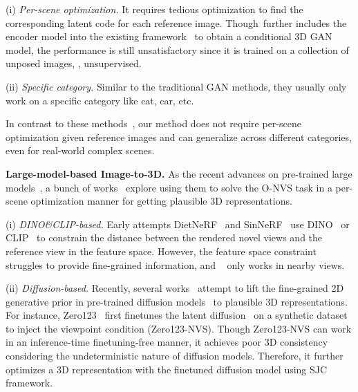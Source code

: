 (i) \textit{Per-scene optimization.} It requires tedious optimization to find the corresponding latent code for each reference image. Though~\cite{Pix2NeRF_cai2022pix2nerf}further includes the encoder model into the existing framework~\cite{PiGAN_chan2021pi} to obtain a conditional 3D GAN model, the performance is still unsatisfactory since it is trained on a collection of unposed images, \ie, unsupervised. 


(ii) \textit{Specific category.} Similar to the traditional GAN methods, they usually only work on a specific category like cat, car, etc.

In contrast to these methods~\cite{GRAF_schwarz2020graf,PiGAN_chan2021pi,GIRAFFE_niemeyer2021giraffe,chan2022EG3D}, our method does not require per-scene optimization given reference images and can generalize across different categories, even for real-world complex scenes. 


\vspace{0.1cm}
\noindent\textbf{Large-model-based Image-to-3D.} 
As the recent advances on pre-trained large models~\cite{caron2021emerging,radford2021CLIP,rombach2022LatentDiff,zhang2023addingControlNet}, a bunch of works~\cite{Jain_2021_ICCV_dietnerf,Xu_2022_SinNeRF,liu2023zero123,tang2023makeit3d} explore using them to solve the O-NVS task in a per-scene optimization manner for getting plausible 3D representations.


(i) \textit{DINO\&CLIP-based.} Early attempts DietNeRF~\cite{Jain_2021_ICCV_dietnerf} and SinNeRF~\cite{Xu_2022_SinNeRF} use DINO~\cite{caron2021emerging} or CLIP~\cite{radford2021CLIP} to constrain the distance between the rendered novel views and the reference view in the feature space. However, the feature space constraint struggles to provide fine-grained information, and ~\cite{Xu_2022_SinNeRF} only works in nearby views. 


(ii) \textit{Diffusion-based.} Recently, several works~\cite{deng2023nerdi,xu2022neurallift,liu2023zero123,tang2023makeit3d} attempt to lift the fine-grained 2D generative prior in pre-trained diffusion models~\cite{rombach2022LatentDiff,zhang2023addingControlNet} to plausible 3D representations. For instance, Zero123~\cite{liu2023zero123} first finetunes the latent diffusion~\cite{rombach2022LatentDiff} on a synthetic dataset~\cite{deitke2023objaverse} to inject the viewpoint condition (Zero123-NVS). Though Zero123-NVS can work in an inference-time finetuning-free manner, it achieves poor 3D consistency considering the undeterministic nature of diffusion models. Therefore, it further optimizes a 3D representation with the finetuned diffusion model using SJC~\cite{wang2023SJC} framework. 


